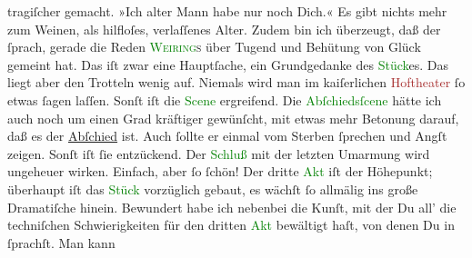                tragiſcher gemacht. »Ich alter Mann\strikeout{,} habe nur noch
               Dich.« Es gibt nichts mehr zum Weinen, als hilfloſes, verlaſſenes Alter. Zudem bin
               ich überzeugt, daß der \label{K_L02726-34v}\label{K_L02726-34h} ſprach,
               gerade die Reden \textsc{\textcolor{green}{Weiring}{}s } über Tugend
               und Behütung von Glück gemeint hat. Das iſt zwar eine Hauptſache, ein Grundgedanke
               des \textcolor{green}{Stück}{}es. Das liegt aber
               den Trotteln wenig auf. Niemals wird man im kaiſerlichen \textcolor{brown}{Hoftheater}{} ſo etwas ſagen
               laſſen. Sonſt iſt die \textcolor{green}{Scene}{}
               ergreifend. Die \textcolor{green}{Abſchiedsſcene}{}
               hätte ich auch {\pb}noch um einen Grad kräftiger
               gewünſcht, mit etwas mehr Betonung darauf, daß es der \uline{Abſchied} ist. \introOben{}Auch ſollte er einmal vom Sterben ſprechen
                  und Angſt zeigen.\introOben{} Sonſt iſt ſie entzückend. Der \textcolor{green}{Schluß}{} mit der letzten Umarmung  wird ungeheuer wirken. Einfach, aber ſo ſchön! Der
               dritte \textcolor{green}{Akt}{} iſt der Höhepunkt;
               überhaupt iſt das \textcolor{green}{Stück}{}
               vorzüglich gebaut, es wächſt ſo allmälig ins große Dramatiſche hinein. Bewundert habe
               ich nebenbei die Kunſt, mit der Du all’ die techniſchen Schwierigkeiten für den
               dritten \textcolor{green}{Akt}{} bewältigt haſt,
               von denen Du in \label{K_L02726-2v}\label{K_L02726-2h} ſprachſt. Man kann
